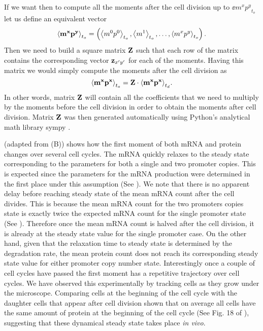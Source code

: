 If we want then to compute all the moments after the cell division up to
$\ee{m^x p^y}_{t_o}$ let us define an equivalent vector
\begin{equation}
\mathbf{\left\langle m^x p^y \right\rangle}_{t_o} = \left(
\left\langle m^0 p^0 \right\rangle_{t_o}, \left\langle m^1 \right\rangle_{t_o}, \ldots , \left\langle m^x p^y \right\rangle_{t_o}
\right).
\end{equation}
Then we need to build a square matrix $\mathbf{Z}$ such that each row of the matrix
contains the corresponding vector $\mathbf{z}_{x' y'}$ for each of the moments.
Having this matrix we would simply compute the moments after the cell division
as
\begin{equation}
\mathbf{\left\langle m^x p^x \right\rangle}_{t_o} = \mathbf{Z} \cdot \mathbf{\left\langle m^x p^x \right\rangle}_{t_d}.
\end{equation}
In other words, matrix $\mathbf{Z}$ will contain all the coefficients that we need
to multiply by the moments before the cell division in order to obtain the
moments after cell division. Matrix $\mathbf{Z}$ was then generated automatically
using Python's analytical math library sympy \cite{sympy}.

 (adapted from (B)) shows how
the first moment of both mRNA and protein changes over several cell cycles. The
mRNA quickly relaxes to the steady state corresponding to the parameters for
both a single and two promoter copies. This is expected since the parameters
for the mRNA production were determined in the first place under this
assumption (See ). We note that there is no apparent delay
before reaching steady state of the mean mRNA count after the cell divides.
This is because the mean mRNA count for the two promoters copies  state is
exactly twice the expected mRNA count for the single promoter state (See
). Therefore once the mean mRNA count is halved after the
cell division, it is already at the steady state value for the single promoter
case. On the other hand, given that the relaxation time to steady state is
determined by the degradation rate, the mean protein count does not reach its
corresponding steady state value for either promoter copy number state.
Interestingly once a couple of cell cycles have passed the first moment has a
repetitive trajectory over cell cycles. We have observed this experimentally by
tracking cells as they grow under the microscope. Comparing cells at the
beginning of the cell cycle with the daughter cells that appear after cell
division shown that on average all cells have the same amount of protein at the
beginning of the cell cycle (See Fig. 18 of \cite{Phillips2019}), suggesting
that these dynamical steady state takes place \textit{in vivo}.

